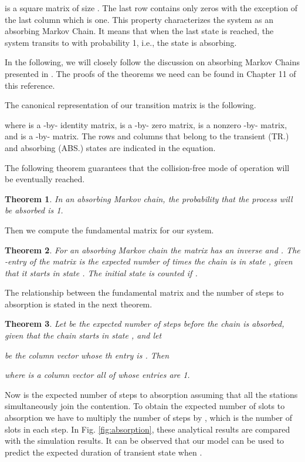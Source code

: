 \documentclass[journal]{IEEEtran}
\newtheorem{theorem}{Theorem}
\begin{document}
 is a square matrix of size . The last row contains only zeros with the exception of the last column which is one. This property characterizes the system as an absorbing Markov Chain. It means that when the last state  is reached, the system transits to  with probability 1, i.e., the state  is absorbing.

In the following, we will closely follow the discussion on absorbing Markov Chains presented in \cite{grinstead1997itp}. The proofs of the theorems we need can be found in Chapter 11 of this reference.

The canonical representation of our transition matrix is the following.

 

where  is a -by- identity matrix,  is a -by- zero matrix,  is a nonzero -by- matrix, and  is a -by- matrix. The rows and columns that belong to the transient (TR.) and absorbing (ABS.) states are indicated in the equation.

The following theorem guarantees that the collision-free mode of operation will be eventually reached.

\begin{theorem}
In an absorbing Markov chain, the probability that the process will be absorbed is 1.

\end{theorem}

Then we compute the fundamental matrix  for our system.
\begin{theorem}
For an absorbing Markov chain the matrix \mbox{} has an inverse
 and 
.  The -entry
 of the 
matrix  is the expected number of times the chain is in state ,
given that 
it starts in state .  The initial state is counted if .
\end{theorem}

The relationship between the fundamental matrix  and the number of steps to absorption is stated in the next theorem. 

\begin{theorem} Let  be the expected number of steps
before
the chain is absorbed, given that the chain starts in state , and let
 
be the column vector whose th entry is . Then

where  is a column vector all of whose entries are 1.
\end{theorem}

Now  is the expected number of steps to absorption assuming that all the stations simultaneously join the contention. To obtain the expected number of slots to absorption we have to multiply the number of steps by , which is the number of slots in each step. In Fig. \ref{fig:absorption}, these analytical results are compared with the simulation results. It can be observed that our model can be used to predict the expected duration of transient state when . 
\end{document}
